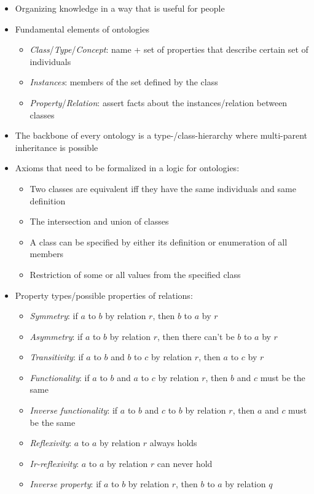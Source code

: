 \begin{itemize}
	\item Organizing knowledge in a way that is useful for people
	\item Fundamental elements of ontologies
	\begin{itemize}
		\item \textit{Class}/\textit{Type}/\textit{Concept}: name + set of properties that describe certain set of individuals
		\item \textit{Instances}: members of the set defined by the class
		\item \textit{Property}/\textit{Relation}: assert facts about the instances/relation between classes
	\end{itemize}
	\item The backbone of every ontology is a type-/class-hierarchy where multi-parent inheritance is possible
	\item Axioms that need to be formalized in a logic for ontologies:
	\begin{itemize}
		\item Two classes are equivalent iff they have the same individuals and same definition
		\item The intersection and union of classes
		\item A class can be specified by either its definition or enumeration of all members
		\item Restriction of some or all values from the specified class
	\end{itemize}
	\item Property types/possible properties of relations:
	\begin{itemize}
		\item \textit{Symmetry}: if $a$ to $b$ by relation $r$, then $b$ to $a$ by $r$
		\item \textit{Asymmetry}: if $a$ to $b$ by relation $r$, then there can't be $b$ to $a$ by $r$
		\item \textit{Transitivity}: if $a$ to $b$ and $b$ to $c$ by relation $r$, then $a$ to $c$ by $r$
		\item \textit{Functionality}: if $a$ to $b$ and $a$ to $c$ by relation $r$, then $b$ and $c$ must be the same
		\item \textit{Inverse functionality}: if $a$ to $b$ and $c$ to $b$ by relation $r$, then $a$ and $c$ must be the same
		\item \textit{Reflexivity}: $a$ to $a$ by relation $r$ always holds
		\item \textit{Ir-reflexivity}: $a$ to $a$ by relation $r$ can never hold
		\item \textit{Inverse property}: if $a$ to $b$ by relation $r$, then $b$ to $a$ by relation $q$
	\end{itemize}
\end{itemize}
